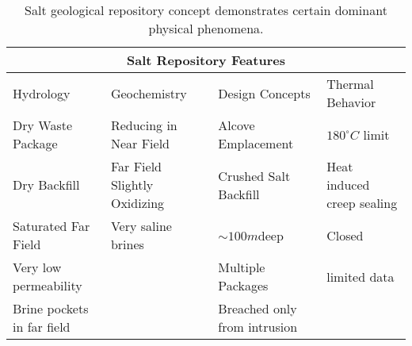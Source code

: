 %
\begin{table}[h!]
  \centering
  \footnotesize{
  \begin{tabular}{|l|l|l|l|}
    \multicolumn{4}{c}{\textbf{Salt Repository Features}}\\
    \hline
    Hydrology & Geochemistry & Design Concepts & Thermal Behavior \\ 
    \hline
    Dry Waste Package & Reducing in Near Field & Alcove Emplacement & $180^\circ C$ limit \cite{von_lensa_red-impact_2008} \\
    Dry Backfill &Far Field Slightly Oxidizing &Crushed Salt Backfill & Heat induced creep sealing\\
    Saturated Far Field& Very saline brines  &$\sim100m$deep & Closed \\
    Very low permeability &  & Multiple Packages &limited data\\
    Brine pockets in far field&&Breached only from intrusion&\\
    \hline
  \end{tabular}
  \caption[Salt Repository Features]{Salt geological repository 
  concept demonstrates certain dominant physical phenomena. }
  \label{tab:salt_tab}
  }
\end{table}




